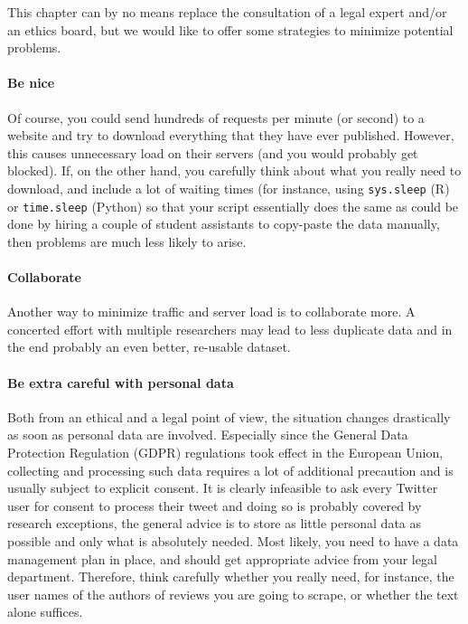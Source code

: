 This chapter can by no means replace the consultation of a legal
expert and/or an ethics board, but we would like to offer some
strategies to minimize potential problems.

\paragraph{Be nice} Of course, you could send hundreds of requests per minute (or second) to a website and try to download everything that they have ever published. However, this causes unnecessary load on their servers (and you would probably  get blocked). If, on the other hand, you carefully think about what you really need to download, and include a lot of waiting times (for instance, using \texttt{sys.sleep} (R) or \texttt{time.sleep} (Python) so that your script essentially does the same as could be done by hiring a couple of student assistants to copy-paste the data manually, then problems are much less likely to arise.

\paragraph{Collaborate} Another way to minimize traffic and server load is to collaborate more. A concerted effort with multiple researchers may lead to less duplicate data and in the end probably an even better, re-usable dataset.

\paragraph{Be extra careful with personal data} Both from an ethical and a legal point of view, the situation changes drastically as soon as personal data are involved. Especially since the General Data Protection Regulation (GDPR) regulations took effect in the European Union, collecting and processing such data requires a lot of additional precaution and is usually subject to explicit consent. It is clearly infeasible to ask every Twitter user  for consent to process their tweet and doing so is probably covered by research exceptions, the general advice is to store as little personal data as possible and only what is absolutely needed. Most likely, you need to have a data management plan in place, and should get appropriate  advice from your legal department. Therefore, think carefully whether you really need, for instance, the user names of the authors of reviews you are going to scrape, or whether the text alone suffices.

